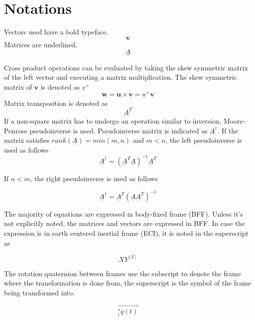 \section*{Notations}

Vectors used have a bold typeface.  
\begin{equation*}
\textbf{v}
\end{equation*}
Matrices are underlined.
\begin{equation*}
\underline{A}
\end{equation*}

Cross product operations can be evaluated by taking the skew symmetric matrix of the left vector and executing a matrix multiplication. The skew symmetric matrix of $\textbf{v}$ is denoted as $\underline{v}^\times$
\begin{equation*}
	\textbf{w} = \textbf{u} \times \textbf{v} = \underline{u}^\times \textbf{v}
\end{equation*}
Matrix transposition is denoted as
\begin{equation*}
\underline{A}^T
\end{equation*}
If a non-square matrix has to undergo an operation similar to inversion, Moore-Penrose pseudoinverse is used. Pseudoinverse matrix is indicated as $\underline{A}^\dagger$. If the matrix satisfies $rank(\underline{A}) = min(m,n)$ and $m < n$, the left pseudoinverse is used as follows
\begin{equation*}
\underline{A}^\dagger    =   (\underline{A}^T \underline{A} )^{-1} \underline{A}^T 
\end{equation*}

If $n < m$, the right pseudoinverse is used as follows

\begin{equation*}
 \underline{A}^\dagger    =  \underline{A}^T  (\underline{A} \underline{A}^T)^{-1}
\end{equation*}


The majority of equations are expressed in body-fixed frame (BFF). Unless it's not explicitly noted, the matrices and vectors are expressed in BFF. In case the expression is in earth centered inertial frame (ECI), it is noted in the superscript as 

\begin{equation*}
XY^{[I]}
\end{equation*}

The rotation quaternion between frames use the subscript to denote the frame where the transformation is done from, the superscript is the symbol of the frame being transformed into.

\begin{equation*}
\vec{^s_i q(t)}
\end{equation*}

